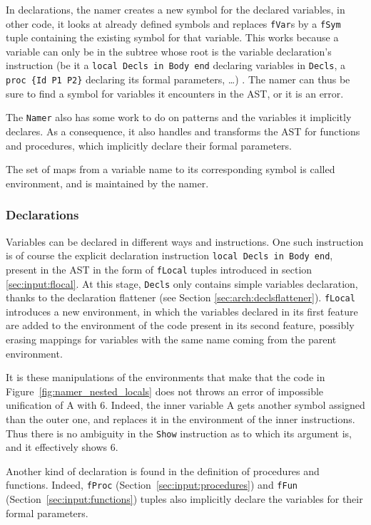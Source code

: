 \documentclass[a4paper]{memoir}
\begin{document}
In declarations, the namer creates a new symbol for the declared variables, in
other code, it looks at already defined symbols and replaces \lstinline!fVar!s
by a \lstinline!fSym! tuple containing the existing symbol for that variable.
This works because a variable can only be in the subtree whose root is the
variable declaration's instruction (be it a \lstinline!local Decls in Body end!
declaring variables in \lstinline!Decls!, a
\lstinline!proc {Id P1 P2}! declaring its formal parameters, \ldots) . The namer
can thus be sure to find a symbol for variables it encounters in the AST, or it
is an error.

The \lstinline!Namer! also has some work to do on patterns and the variables it
implicitly declares. As a consequence, it also handles and transforms the AST
for functions and procedures, which implicitly declare their formal parameters.

The set of maps from a variable name to its corresponding symbol is called environment, and is maintained by the namer.


\subsubsection{Declarations}
Variables can be declared in different ways and instructions.
One such instruction is of course the explicit declaration instruction
\lstinline!local Decls in Body end!, present in the AST in the form of
\lstinline!fLocal! tuples introduced in section \ref{sec:input:flocal}. At this
stage, \lstinline!Decls! only contains simple variables declaration, thanks to
the declaration flattener (see Section \ref{sec:arch:declsflattener}).
\lstinline!fLocal! introduces a new environment, in which the variables declared
in its first feature are added to the environment of the code present in its
second feature, possibly erasing mappings for variables with the same name
coming from the parent environment. 

It is these manipulations of the environments that make that the code in
Figure~\ref{fig:namer_nested_locals} does not throws an error of impossible
unification of A with 6. Indeed, the inner variable A gets another symbol
assigned than the outer one, and replaces it in the environment of the inner
instructions. Thus there is no ambiguity in the \lstinline!Show! instruction as
to which its argument is, and it effectively shows 6.

Another kind of declaration is found in the definition of procedures and
functions. Indeed, \lstinline!fProc! (Section~\ref{sec:input:procedures}) and
\lstinline!fFun! (Section~\ref{sec:input:functions}) tuples also implicitly
declare the variables for their formal parameters. %
\end{document}
